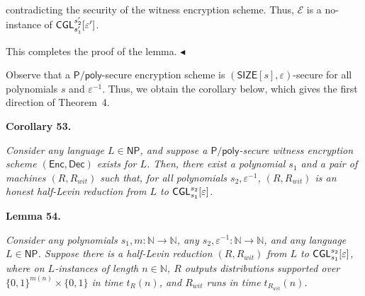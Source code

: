 \documentclass[10pt,a4paper]{article}
\begin{document}
contradicting the security of the witness encryption scheme. Thus, $\mathcal{E}$ is a no-instance of ${\sf CGL}_{s_{1}^{\prime}}^{s_{2}^{\prime}}[\varepsilon^{\prime}]$.\par




This completes the proof of the lemma.
$\blacktriangleleft$\par




Observe that a ${\mathsf{P}}/{\mathsf{poly}}$-secure encryption scheme is $({\mathsf{SIZE}}[s],\varepsilon)$-secure for all polynomials $s$ and $\varepsilon^{-1}$. Thus, we obtain the corollary below, which gives the first direction of Theorem 4.\par





\par\medskip\noindent\textbf{
\textbf{Corollary 53}\textbf{.}
}\par



\emph{Consider any language $L\in{\mathsf{NP}}$, and suppose a ${\mathsf{P}}/{\mathsf{poly}}$-secure witness encryption scheme $({\mathsf{Enc}},{\mathsf{Dec}})$ exists for $L$. Then, there exist a polynomial $s_{1}$ and a pair of machines $(R,R_{wit})$ such that, for all polynomials $s_{2},\varepsilon^{-1}$, $(R,R_{wit})$ is an honest half-Levin reduction from $L$ to ${\sf CGL}^{s_{2}}_{s_{1}}[\varepsilon]$.}\par







\par\medskip\noindent\textbf{
\textbf{Lemma 54}\textbf{.}
}\par



\emph{Consider any polynomials $s_{1},m:\mathbb{N}\to\mathbb{N}$, any $s_{2},\varepsilon^{-1}:\mathbb{N}\to\mathbb{N}$, and any language $L\in{\mathsf{NP}}$. Suppose there is a half-Levin reduction $(R,R_{wit})$ from $L$ to ${\sf CGL}_{s_{1}}^{s_{2}}[\varepsilon]$, where on $L$-instances of length $n\in\mathbb{N}$, $R$ outputs distributions supported over $\{0,1\}^{m(n)}\times\{0,1\}$ in time $t_{R}(n)$, and $R_{wit}$ runs in time $t_{R_{wit}}(n)$.}\par
\end{document}
